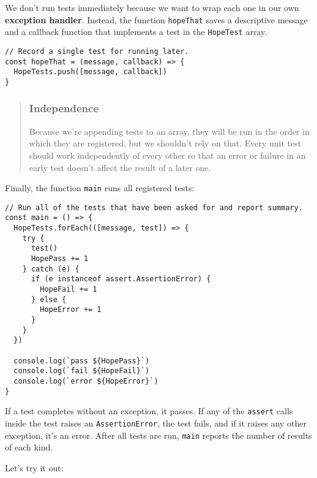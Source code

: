 \documentclass[krantzl]{krantz}
\newcommand{\glossref}[1]{\textbf{#1}}
\newenvironment{callout}{\savenotes\begin{tBox}\begin{quotation}\toggletrue{inbox}\renewcommand{\thempfootnote}{\arabic{footnote}}}{\end{quotation}\vspace{\baselineskip}\end{tBox}\togglefalse{inbox}\spewnotes}
\begin{document}
We don't run tests immediately
because we want to wrap each one in our own \glossref{exception handler}.
Instead,
the function \texttt{hopeThat} saves a descriptive message and a callback function that implements a test
in the \texttt{HopeTest} array.


\begin{lstlisting}[frame=single,frameround=tttt]
// Record a single test for running later.
const hopeThat = (message, callback) => {
  HopeTests.push([message, callback])
}
\end{lstlisting}


\begin{callout}


\subsubsection*{Independence}


Because we're appending tests to an array,
they will be run in the order in which they are registered,
but we shouldn't rely on that.
Every unit test should work independently of every other
so that an error or failure in an early test
doesn't affect the result of a later one.

\end{callout}


Finally,
the function \texttt{main} runs all registered tests:


\begin{lstlisting}[frame=single,frameround=tttt]
// Run all of the tests that have been asked for and report summary.
const main = () => {
  HopeTests.forEach(([message, test]) => {
    try {
      test()
      HopePass += 1
    } catch (e) {
      if (e instanceof assert.AssertionError) {
        HopeFail += 1
      } else {
        HopeError += 1
      }
    }
  })

  console.log(`pass ${HopePass}`)
  console.log(`fail ${HopeFail}`)
  console.log(`error ${HopeError}`)
}
\end{lstlisting}



\noindent If a test completes without an exception, it passes.
If any of the \texttt{assert} calls inside the test raises an \texttt{AssertionError},
the test fails,
and if it raises any other exception,
it's an error.
After all tests are run,
\texttt{main} reports the number of results of each kind.


Let's try it out:
\end{document}
